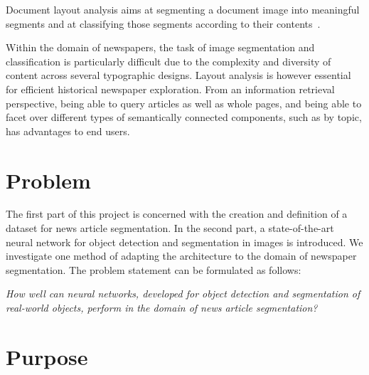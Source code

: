 \documentclass[oneside, english, bibtex]{kththesis}
\begin{document}
Document layout analysis aims at segmenting a document image into meaningful segments and at classifying those segments according to their contents~\cite{ESKENAZI20171}.

Within the domain of newspapers, the task of image segmentation and classification is particularly difficult due to the complexity and diversity of content across several typographic designs.
Layout analysis is however essential for efficient historical newspaper exploration.
From an information retrieval perspective, being able to query articles as well as whole pages, and being able to facet over different types of semantically connected components, such as by topic, has advantages to end users.



\section{Problem}
\label{sec:problem}

The first part of this project is concerned with the creation and definition of a dataset for news article segmentation. In the second part, a state-of-the-art neural network for object detection and segmentation in images is introduced. We investigate one method of adapting the architecture to the domain of newspaper segmentation. The problem statement can be formulated as follows:

	\textit{How well can neural networks, developed for object detection and segmentation of real-world objects, perform in the domain of news article segmentation?}

\section{Purpose}
\end{document}
